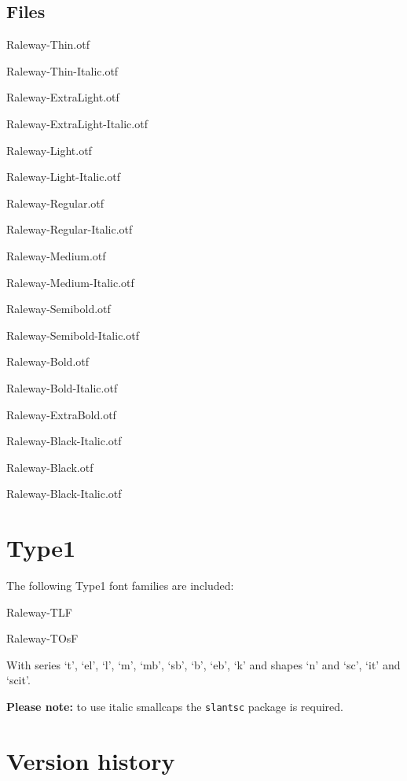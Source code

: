\documentclass[10pt,a4paper,english]{article}
\begin{document}
\begin{multicols}{2}
\subsection{Files}
\begin{itemize*}
	\item Raleway-Thin.otf
	\item Raleway-Thin-Italic.otf
	\item Raleway-ExtraLight.otf
	\item Raleway-ExtraLight-Italic.otf
	\item Raleway-Light.otf
	\item Raleway-Light-Italic.otf
	\item Raleway-Regular.otf
	\item Raleway-Regular-Italic.otf
	\item Raleway-Medium.otf
	\item Raleway-Medium-Italic.otf
	\item Raleway-Semibold.otf
	\item Raleway-Semibold-Italic.otf
	\item Raleway-Bold.otf
	\item Raleway-Bold-Italic.otf
	\item Raleway-ExtraBold.otf
	\item Raleway-Black-Italic.otf
	\item Raleway-Black.otf
	\item Raleway-Black-Italic.otf
\end{itemize*}

\section{Type1}
The following Type1 font families are included:
\begin{itemize*}
	\item Raleway-TLF
	\item Raleway-TOsF
\end{itemize*}
With series ‘t’, ‘el’, ‘l’, ‘m’, ‘mb’, ‘sb’, ‘b’, ‘eb’, ‘k’ and shapes ‘n’ and ‘sc’, ‘it’ and ‘scit’.

\textbf{Please note:} to use italic smallcaps the \texttt{slantsc} package is required.

\section{Version history}

\end{multicols}
\end{document}

